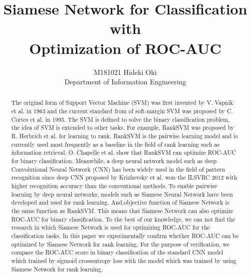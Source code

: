 \documentclass[twocolumn,10pt]{article}
\begin{document}
\title{Siamese Network for Classification with \\ Optimization of ROC-AUC}
\author{M181021 Hideki Oki \\ Department of Information Engineering}
\date{\empty}
\maketitle
\begin{abstract}
The original form of Support Vector Machine (SVM) was first invented by V. Vapnik et al. \cite{Vapnik1963} in 1963 and the current standard from of soft-margin SVM was proposed by C. Cortes et al. \cite{SVM1995} in 1995.
The SVM is defined to solve the binary classification problem, the idea of SVM is extended to other tasks.
For example, RankSVM was proposed by R. Herbrich et al. \cite{RankSVM} for learning to rank. 
RankSVM is the pairwise learning model and is currently used most frequently as a baseline in the field of rank learning such as information retrieval.
O. Chapelle et al. \cite{ROCAUC} show that RankSVM can optimize ROC-AUC for binary classification.
Meanwhile, a deep neural network model such as deep Convolutional Neural Network (CNN) has been widely used in the field of pattern recognition since deep CNN proposed by Krizhevsky et al. \cite{Krizhevsky2012} won the ILSVRC 2012 with higher recognition accuracy than the conventional methods.
To enable pairwise learning by deep neural networks, 
models such as Siamese Neural Network \cite{Bromely1993,Chopra2005,Hadsell2006} have been developed and used for rank learning.
And,objective function of Siamese Network is the same function as RankSVM.
This means that Siamese Network can also optimize ROC-AUC for binary classification.
To the best of our knowledge, we can not find the research in which Siamese Network is used for optimizing ROC-AUC for the classification tasks.
In this paper we experimentally confirm whether ROC-AUC can be optimized by Siamese Network for rank learning.
For the purpose of verification, we compare the ROC-AUC score in binary classification of the standard CNN model which trained by sigmoid crossentropy loss with the model which was trained by using Siamese Network for rank learning.
\end{abstract}
\end{document}
